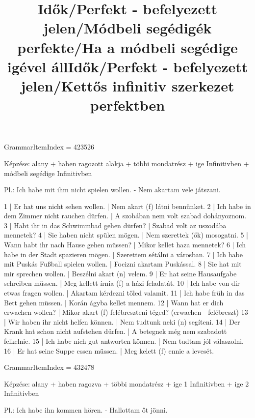 \title{Idők/Perfekt - befelyezett jelen/Módbeli segédigék perfekte/Ha a módbeli segédige igével áll}

GrammarItemIndex = 423526

\begin{desc}
Képzése:
alany + haben ragozott alakja + többi mondatrész + ige Infinitivben + módbeli segédige Infinitivben

Pl.: Ich habe mit ihm nicht spielen wollen. - Nem akartam vele játszani.
\end{desc}

\begin{exmp}
1 | Er hat uns nicht sehen wollen. | Nem akart (f) látni bennünket.
2 | Ich habe in dem Zimmer nicht rauchen dürfen. | A szobában nem volt szabad dohányoznom.
3 | Habt ihr in das Schwimmbad gehen dürfen? | Szabad volt az uszodába mennetek?
4 | Sie haben nicht spülen mögen. | Nem szerettek (ők) mosogatni.
5 | Wann habt ihr nach Hause gehen müssen? | Mikor kellet haza mennetek?
6 | Ich habe in der Stadt spazieren mögen. | Szerettem sétálni a városban.
7 | Ich habe mit Puskás Fußball spielen wollen. | Focizni akartam Puskással.
8 | Sie hat mit mir sprechen wollen. | Beszélni akart (n) velem.
9 | Er hat seine Hausaufgabe schreiben müssen. | Meg kellett írnia (f) a házi feladatát.
10 | Ich habe von dir etwas fragen wollen. | Akartam kérdezni tőled valamit.
11 | Ich habe früh in das Bett gehen müssen. | Korán ágyba kellet mennem.
12 | Wann hat er dich erwachen wollen? | Mikor akart (f) felébreszteni téged? (erwachen - felébreszt)
13 | Wir haben ihr nicht helfen können. | Nem tudtunk neki (n) segíteni.
14 | Der Krank hat schon nicht aufstehen dürfen. | A betegnek még nem szabadott felkelnie.
15 | Ich habe nich gut antworten können. | Nem tudtam jól válaszolni.
16 | Er hat seine Suppe essen müssen. | Meg kelett (f) ennie a levesét.
\end{exmp}

\title{Idők/Perfekt - befelyezett jelen/Kettős infinitiv szerkezet perfektben}

GrammarItemIndex = 432478

\begin{desc}
Képzése:
alany + haben ragozva + többi mondatrész + ige 1 Infinitivben + ige 2 Infinitivben

Pl.: Ich habe ihn kommen hören. - Hallottam őt jönni.
\end{desc}

